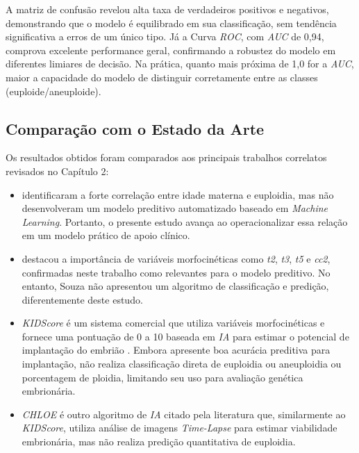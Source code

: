 A matriz de confusão revelou alta taxa de verdadeiros positivos e negativos, demonstrando que o modelo é equilibrado em sua classificação, sem tendência significativa a erros de um único tipo. Já a Curva \textit{ROC}, com \textit{AUC} de 0,94, comprova excelente performance geral, confirmando a robustez do modelo em diferentes limiares de decisão. Na prática, quanto mais próxima de 1,0 for a \textit{AUC}, maior a capacidade do modelo de distinguir corretamente entre as classes (euploide/aneuploide).

\subsection{Comparação com o Estado da Arte}
Os resultados obtidos foram comparados aos principais trabalhos correlatos revisados no Capítulo 2:

\begin{itemize}
    \item {} identificaram a forte correlação entre idade materna e euploidia, mas não desenvolveram um modelo preditivo automatizado baseado em \textit{Machine Learning}. Portanto, o presente estudo avança ao operacionalizar essa relação em um modelo prático de apoio clínico.

    \item {} destacou a importância de variáveis morfocinéticas como \textit{t2}, \textit{t3}, \textit{t5} e \textit{cc2}, confirmadas neste trabalho como relevantes para o modelo preditivo. No entanto, Souza não apresentou um algoritmo de classificação e predição, diferentemente deste estudo.

    \item \textit{KIDScore\texttrademark} é um sistema comercial que utiliza variáveis morfocinéticas e fornece uma pontuação de 0 a 10 baseada em \textit{IA} para estimar o potencial de implantação do embrião \cite{gazzo2020}. Embora apresente boa acurácia preditiva para implantação, não realiza classificação direta de euploidia ou aneuploidia ou porcentagem de ploidia, limitando seu uso para avaliação genética embrionária.

    \item \textit{CHLOE\texttrademark} é outro algoritmo de \textit{IA} citado pela literatura que, similarmente ao \textit{KIDScore}, utiliza análise de imagens \textit{Time-Lapse} para estimar viabilidade embrionária, mas não realiza predição quantitativa de euploidia.
\end{itemize}

